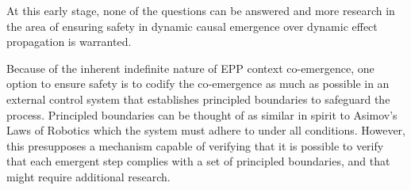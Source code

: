 At this early stage, none of the questions can be answered and more research in the area of ensuring safety in dynamic causal emergence over dynamic effect propagation is warranted.

Because of the inherent indefinite nature of EPP context co-emergence, one option to ensure safety is to codify the co-emergence as much as possible in an external control system that establishes principled boundaries to safeguard the process. Principled boundaries can be thought of as similar in spirit to Asimov's Laws of Robotics which the system must adhere to under all conditions. However, this presupposes a mechanism capable of verifying that it is possible to verify that each emergent step complies with a set of principled boundaries, and that might require additional research.

\newpage
